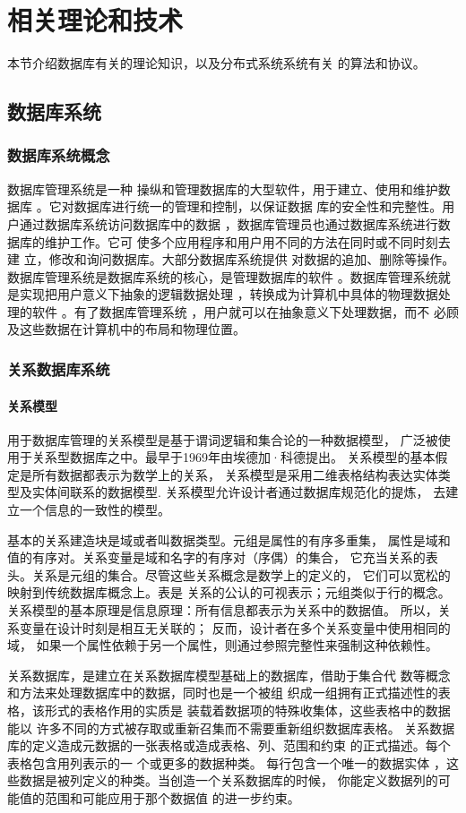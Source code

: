
\chapter{相关理论和技术}
本节介绍数据库有关的理论知识，以及分布式系统系统有关
的算法和协议。
\section{数据库系统}
\subsection{数据库系统概念}
数据库管理系统是一种
操纵和管理数据库的大型软件，用于建立、使用和维护数据库
。它对数据库进行统一的管理和控制，以保证数据
库的安全性和完整性。用户通过数据库系统访问数据库中的数据
，数据库管理员也通过数据库系统进行数据库的维护工作。它可
使多个应用程序和用户用不同的方法在同时或不同时刻去建
立，修改和询问数据库。大部分数据库系统提供
对数据的追加、删除等操作。
数据库管理系统是数据库系统的核心，是管理数据库的软件
。数据库管理系统就是实现把用户意义下抽象的逻辑数据处理
，转换成为计算机中具体的物理数据处理的软件
。有了数据库管理系统
，用户就可以在抽象意义下处理数据，而不
必顾及这些数据在计算机中的布局和物理位置。
\subsection{关系数据库系统}
\subsubsection{关系模型}
用于数据库管理的关系模型是基于谓词逻辑和集合论的一种数据模型，
广泛被使用于关系型数据库之中。最早于1969年由埃德加·科德提出。
关系模型的基本假定是所有数据都表示为数学上的关系，
关系模型是采用二维表格结构表达实体类型及实体间联系的数据模型.
关系模型允许设计者通过数据库规范化的提炼，
去建立一个信息的一致性的模型。

基本的关系建造块是域或者叫数据类型。元组是属性的有序多重集，
属性是域和值的有序对。关系变量是域和名字的有序对（序偶）的集合，
它充当关系的表头。关系是元组的集合。尽管这些关系概念是数学上的定义的，
它们可以宽松的映射到传统数据库概念上。表是
关系的公认的可视表示；元组类似于行的概念。
关系模型的基本原理是信息原理：所有信息都表示为关系中的数据值。
所以，关系变量在设计时刻是相互无关联的；
反而，设计者在多个关系变量中使用相同的域，
如果一个属性依赖于另一个属性，则通过参照完整性来强制这种依赖性。

关系数据库，是建立在关系数据库模型基础上的数据库，借助于集合代
数等概念和方法来处理数据库中的数据，同时也是一个被组
织成一组拥有正式描述性的表格，该形式的表格作用的实质是
装载着数据项的特殊收集体，这些表格中的数据能以
许多不同的方式被存取或重新召集而不需要重新组织数据库表格。
关系数据库的定义造成元数据的一张表格或造成表格、列、范围和约束
的正式描述。每个表格包含用列表示的一
个或更多的数据种类。 每行包含一个唯一的数据实体
，这些数据是被列定义的种类。当创造一个关系数据库的时候，
你能定义数据列的可能值的范围和可能应用于那个数据值
的进一步约束。
